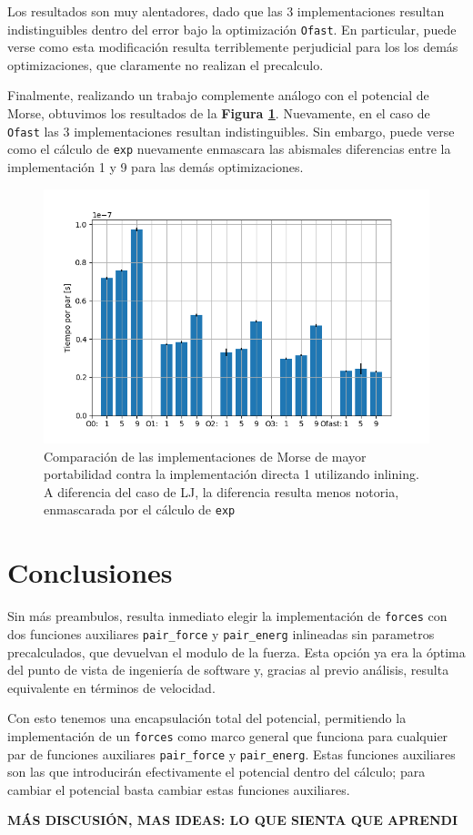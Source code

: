 \documentclass[twoside, 12pt]{article}
\begin{document}
Los resultados son muy alentadores, dado que las 3 implementaciones resultan indistinguibles dentro del error bajo la optimizaci\'on \texttt{Ofast}. En particular, puede verse como esta modificaci\'on resulta terriblemente perjudicial para los los dem\'as optimizaciones, que claramente no realizan el precalculo. 

Finalmente, realizando un trabajo complemente an\'alogo con el potencial de Morse, obtuvimos los resultados de la \textbf{Figura \ref{fig:CompEsp_morse_inline}}. Nuevamente, en el caso de \texttt{Ofast} las 3 implementaciones resultan indistinguibles. Sin embargo, puede verse como el c\'alculo de \texttt{exp} nuevamente enmascara las abismales diferencias entre la implementaci\'on 1 y 9 para las dem\'as optimizaciones.

\begin{figure}[h]
	\centering
	\includegraphics[trim = 10mm 5mm 10mm 5mm, clip, width=0.6\columnwidth]{Comp_tiempos_morse_inline.png}
	\caption{Comparaci\'on de las implementaciones de Morse de mayor portabilidad contra la implementaci\'on directa 1 utilizando inlining. A diferencia del caso de LJ, la diferencia resulta menos notoria, enmascarada por el c\'alculo de \texttt{exp}}
	\label{fig:CompEsp_morse_inline}
\end{figure}

\section{Conclusiones}

Sin m\'as preambulos, resulta inmediato elegir la implementaci\'on de \texttt{forces} con dos funciones auxiliares \texttt{pair\_force} y \texttt{pair\_energ} inlineadas sin parametros precalculados, que devuelvan el modulo de la fuerza. Esta opci\'on ya era la \'optima del punto de vista de ingenier\'ia de software y, gracias al previo an\'alisis, resulta equivalente en t\'erminos de velocidad.

Con esto tenemos una encapsulación total del potencial, permitiendo la implementaci\'on de un \texttt{forces} como marco general que funciona para cualquier par de funciones auxiliares \texttt{pair\_force} y \texttt{pair\_energ}. Estas funciones auxiliares son las que introducir\'an efectivamente el potencial dentro del c\'alculo; para cambiar el potencial basta cambiar estas funciones auxiliares.

\textbf{MÁS DISCUSIÓN, MAS IDEAS: LO QUE SIENTA QUE APRENDI}
\end{document}

